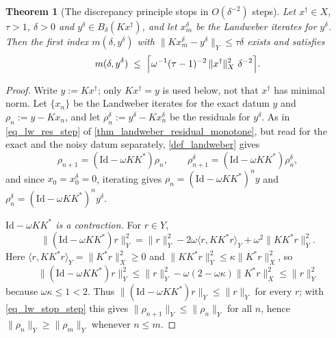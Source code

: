 \documentclass[a4paper]{report}
\theoremstyle{plain}
\newtheorem{theorem}{Theorem}[chapter]
\theoremstyle{definition}
\theoremstyle{remark}
\newcommand{\Id}{\mathrm{Id}}
\newcommand{\dg}{^{\dagger}}
\begin{document}
\begin{theorem}[The discrepancy principle stops in $O(\delta^{-2})$ steps]
  \label{thm_landweber_stopping_bound}
  Let $x\dg \in X$, $\tau > 1$, $\delta > 0$ and $y^{\delta} \in B_{\delta}(Kx\dg)$, and
  let $x^{\delta}_m$ be the Landweber iterates for $y^{\delta}$.  Then the first index
  $m(\delta,y^{\delta})$ with $\|Kx^{\delta}_m - y^{\delta}\|_Y \le \tau\delta$ exists and
  satisfies
  \[
    m(\delta,y^{\delta}) \;\le\;
      \Bigl\lceil \omega^{-1}(\tau-1)^{-2}\,\|x\dg\|_X^{2}\ \delta^{-2} \Bigr\rceil .
  \]
\end{theorem}

\begin{proof}
  Write $y := Kx\dg$; only $Kx\dg = y$ is used below, not that $x\dg$ has minimal norm.
  Let $\{x_n\}$ be the Landweber iterates for the exact datum $y$ and
  $\rho_n := y - Kx_n$, and let $\rho^{\delta}_n := y^{\delta} - Kx^{\delta}_n$ be the
  residuals for $y^{\delta}$.  As in \eqref{eq_lw_res_step} of
  \cref{thm_landweber_residual_monotone}, but read for the exact and the noisy datum
  separately, \cref{def_landweber} gives
  \begin{equation}\label{eq_lw_stop_step}
    \rho_{n+1} = (\Id - \omega KK^{*})\rho_n ,
    \qquad
    \rho^{\delta}_{n+1} = (\Id - \omega KK^{*})\rho^{\delta}_n ,
  \end{equation}
  and since $x_0 = x^{\delta}_0 = 0$, iterating gives $\rho_n = (\Id-\omega KK^{*})^{n}y$
  and $\rho^{\delta}_n = (\Id - \omega KK^{*})^{n}y^{\delta}$.

  \emph{$\Id - \omega KK^{*}$ is a contraction.}  For $r \in Y$,
  \[
    \|(\Id - \omega KK^{*})r\|_Y^{2}
      = \|r\|_Y^{2} - 2\omega\langle r, KK^{*}r\rangle_Y + \omega^{2}\|KK^{*}r\|_Y^{2} .
  \]
  Here $\langle r, KK^{*}r\rangle_Y = \|K^{*}r\|_X^{2} \ge 0$ and
  $\|KK^{*}r\|_Y^{2} \le \kappa\|K^{*}r\|_X^{2}$, so
  \[
    \|(\Id - \omega KK^{*})r\|_Y^{2}
      \le \|r\|_Y^{2} - \omega(2 - \omega\kappa)\|K^{*}r\|_X^{2} \le \|r\|_Y^{2}
  \]
  because $\omega\kappa \le 1 < 2$.  Thus $\|(\Id - \omega KK^{*})r\|_Y \le \|r\|_Y$ for
  every $r$; with \eqref{eq_lw_stop_step} this gives $\|\rho_{n+1}\|_Y \le \|\rho_n\|_Y$
  for all $n$, hence $\|\rho_n\|_Y \ge \|\rho_m\|_Y$ whenever $n \le m$.


\end{proof}
\end{document}
